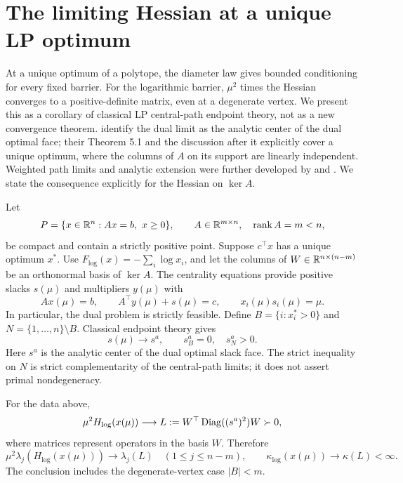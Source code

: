 \section{The limiting Hessian at a unique LP optimum}
\label{sec:lp-limits}

At a unique optimum of a polytope, the diameter law gives bounded
conditioning for every fixed barrier. For the logarithmic barrier,
$\mu^2$ times the Hessian converges to a positive-definite matrix, even
at a degenerate vertex. We present this
as a corollary of classical LP central-path endpoint theory, not as a
new convergence theorem. \citet[Theorem 3.3]{adler1991} identify the dual limit as the analytic
center of the dual optimal face; their Theorem 5.1 and the discussion
after it explicitly cover a unique optimum, where the columns of $A$ on
its support are linearly independent. Weighted path limits
and analytic extension were further developed by
\citet{guler1994} and \citet{halicka1999}. We state the consequence explicitly
for the Hessian on $\ker A$.

Let
\begin{equation}
 P=\{x\in\mathbb R^n:Ax=b,\ x\geq0\},\qquad
 A\in\mathbb R^{m\times n},\quad\operatorname{rank}A=m<n,
 \label{eq:lp-standard}
\end{equation}
be compact and contain a strictly positive point. Suppose $c^\top x$
has a unique optimum $x^*$. Use $F_{\log}(x)=-\sum_i\log x_i$, and let the columns of
$W\in\mathbb R^{n\times(n-m)}$ be an orthonormal basis of $\ker A$.
The centrality equations provide positive slacks $s(\mu)$ and
multipliers $y(\mu)$ with
\begin{equation}
 Ax(\mu)=b,\qquad A^\top y(\mu)+s(\mu)=c,
 \qquad x_i(\mu)s_i(\mu)=\mu.
 \label{eq:lp-centrality}
\end{equation}
In particular, the dual problem is strictly feasible. Define
$B=\{i:x_i^*>0\}$ and $N=\{1,\ldots,n\}\setminus B$.
Classical endpoint theory gives
\begin{equation}
 s(\mu)\longrightarrow s^a,\qquad s_B^a=0,\quad s_N^a>0.
 \label{eq:lp-slack-limit}
\end{equation}
Here $s^a$ is the analytic center of the dual optimal slack face.
The strict inequality on $N$ is strict complementarity of the
central-path limits; it does not assert primal nondegeneracy.

\begin{proposition}
\label{prop:lp-limit}
For the data above,
\begin{equation}
 \mu^2 H_{\log}(x(\mu))
 \longrightarrow L:=W^\top\operatorname{Diag}((s^a)^2)W\succ0,
 \label{eq:lp-hessian-limit}
\end{equation}
where matrices represent operators in the basis $W$. Therefore
\begin{equation}
 \mu^2\lambda_j(H_{\log}(x(\mu)))\longrightarrow\lambda_j(L)
 \quad(1\leq j\leq n-m),\qquad
 \kappa_{\log}(x(\mu))\longrightarrow\kappa(L)<\infty.
 \label{eq:lp-condition-limit}
\end{equation}
The conclusion includes the degenerate-vertex case $|B|<m$.
\end{proposition}

